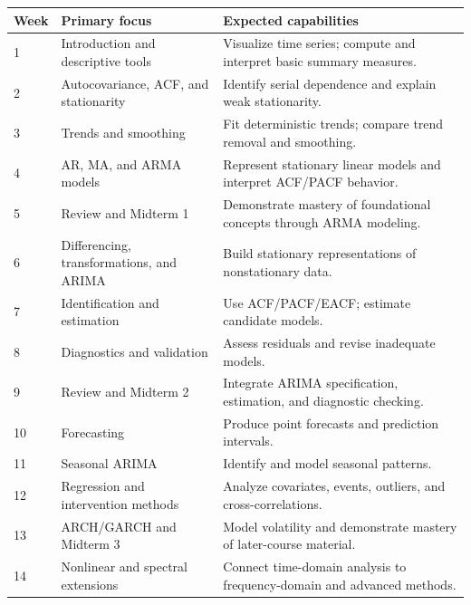 \documentclass[11pt]{article}
\begin{document}
\begin{longtable}{p{} p{} p{}}
\toprule
\textbf{Week} & \textbf{Primary focus} & \textbf{Expected capabilities} \\
\midrule
\endhead

1 & Introduction and descriptive tools &
Visualize time series; compute and interpret basic summary measures. \\

2 & Autocovariance, ACF, and stationarity &
Identify serial dependence and explain weak stationarity. \\

3 & Trends and smoothing &
Fit deterministic trends; compare trend removal and smoothing. \\

4 & AR, MA, and ARMA models &
Represent stationary linear models and interpret ACF/PACF behavior. \\

5 & Review and Midterm 1 &
Demonstrate mastery of foundational concepts through ARMA modeling. \\

6 & Differencing, transformations, and ARIMA &
Build stationary representations of nonstationary data. \\

7 & Identification and estimation &
Use ACF/PACF/EACF; estimate candidate models. \\

8 & Diagnostics and validation &
Assess residuals and revise inadequate models. \\

9 & Review and Midterm 2 &
Integrate ARIMA specification, estimation, and diagnostic checking. \\

10 & Forecasting &
Produce point forecasts and prediction intervals. \\

11 & Seasonal ARIMA &
Identify and model seasonal patterns. \\

12 & Regression and intervention methods &
Analyze covariates, events, outliers, and cross-correlations. \\

13 & ARCH/GARCH and Midterm 3 &
Model volatility and demonstrate mastery of later-course material. \\

14 & Nonlinear and spectral extensions &
Connect time-domain analysis to frequency-domain and advanced methods. \\

\bottomrule
\end{longtable}
\end{document}

